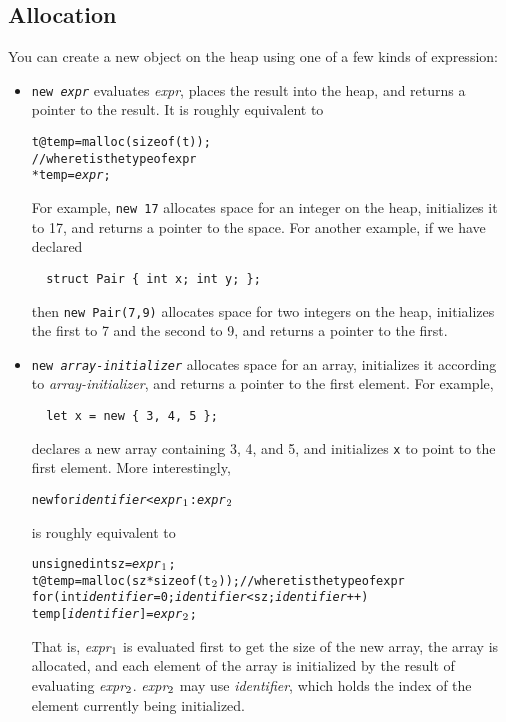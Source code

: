\subsection{Allocation}
You can create a new object on the heap using one of a few kinds of
expression: 
\begin{itemize}
\item \texttt{new {\it expr}} evaluates \textit{expr}, places the
  result into the heap, and returns a pointer to the result.  It is
  roughly equivalent to
\begin{alltt}
  t @ temp = malloc(sizeof(t));
  // where t is the type of expr
  *temp = {\it expr};
\end{alltt}
  For example, \texttt{new 17} allocates space for an integer on the
  heap, initializes it to 17, and returns a pointer to the space.  For
  another example, if we have declared
\begin{verbatim}
  struct Pair { int x; int y; };
\end{verbatim}
  then \texttt{new Pair(7,9)} allocates space for two integers on the
  heap, initializes the first to 7 and the second to 9, and returns a
  pointer to the first.

\item \texttt{new {\it array-initializer}} allocates space for an
  array, initializes it according to \textit{array-initializer}, and
  returns a pointer to the first element.  For example,
\begin{verbatim}
  let x = new { 3, 4, 5 };
\end{verbatim}
  declares a new array containing 3, 4, and 5, and initializes
  \texttt{x} to point to the first element.  More interestingly,
\begin{alltt}
  new \lb for {\it identifier} < {\it expr}\(\sb{1}\) : {\it expr}\(\sb{2}\) \rb
\end{alltt}
  is roughly equivalent to
\begin{alltt}
  unsigned int sz = {\it expr}\(\sb{1}\);
  t @ temp = malloc(sz * sizeof(t\(\sb{2}\))); // where t is the  type of expr
  for (int {\it identifier} = 0; {\it identifier} < sz; {\it identifier}++)
    temp[{\it identifier}] = {\it expr}\(\sb{2}\);
\end{alltt}
  That is, 
  {\it expr}\(\sb{1}\)
  is evaluated first to get the size of the new array,
  the array is allocated, and each element of the array is
  initialized by the result of evaluating
  {\it expr}\(\sb{2}\).
  {\it expr}\(\sb{2}\) may use {\it identifier}, which 
  holds the index of the element currently being initialized.
  

\end{itemize}
